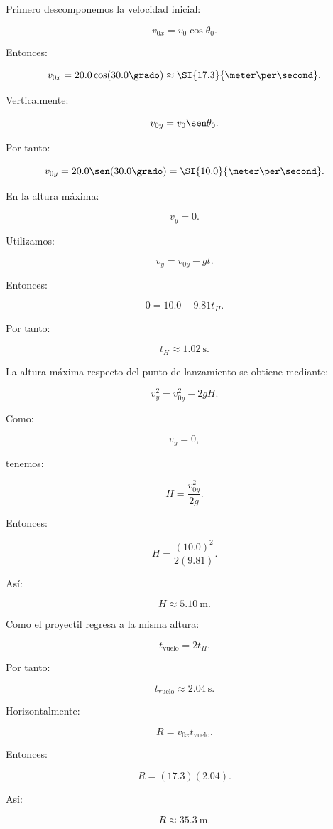 \begin{explicacion}
Primero descomponemos la velocidad inicial:

\[
v_{0x}
=
v_0\cos\theta_0.
\]

Entonces:

\[
v_{0x}
=
20.0\cos(30.0\grado)
\approx
\SI{17.3}{\meter\per\second}.
\]

Verticalmente:

\[
v_{0y}
=
v_0\sen\theta_0.
\]

Por tanto:

\[
v_{0y}
=
20.0\sen(30.0\grado)
=
\SI{10.0}{\meter\per\second}.
\]

En la altura máxima:

\[
v_y=0.
\]

Utilizamos:

\[
v_y=v_{0y}-gt.
\]

Entonces:

\[
0
=
10.0-9.81t_H.
\]

Por tanto:

\[
\boxed{
t_H\approx\SI{1.02}{\second}
}.
\]

La altura máxima respecto del punto de lanzamiento se obtiene mediante:

\[
v_y^2
=
v_{0y}^2-2gH.
\]

Como:

\[
v_y=0,
\]

tenemos:

\[
H
=
\frac{v_{0y}^2}{2g}.
\]

Entonces:

\[
H
=
\frac{(10.0)^2}{2(9.81)}.
\]

Así:

\[
\boxed{
H\approx\SI{5.10}{\meter}
}.
\]

Como el proyectil regresa a la misma altura:

\[
t_{\mathrm{vuelo}}=2t_H.
\]

Por tanto:

\[
\boxed{
t_{\mathrm{vuelo}}
\approx
\SI{2.04}{\second}
}.
\]

Horizontalmente:

\[
R=v_{0x}t_{\mathrm{vuelo}}.
\]

Entonces:

\[
R
=
(17.3)(2.04).
\]

Así:

\[
\boxed{
R\approx\SI{35.3}{\meter}
}.
\]
\end{explicacion}


